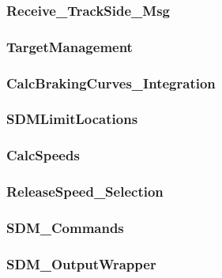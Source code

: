 \subsubsection{Receive\_TrackSide\_Msg}


\subsubsection{TargetManagement}


\subsubsection{CalcBrakingCurves\_Integration}


\subsubsection{SDMLimitLocations}


\subsubsection{CalcSpeeds}


\subsubsection{ReleaseSpeed\_Selection}


\subsubsection{SDM\_Commands}


\subsubsection{SDM\_OutputWrapper}

